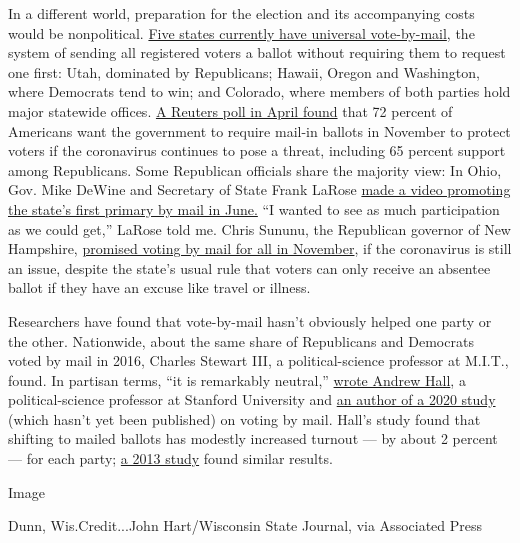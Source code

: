 In a different world, preparation for the election and its accompanying
costs would be nonpolitical. \href{https://www.voteathome.org/}{Five
states currently have universal vote-by-mail}, the system of sending all
registered voters a ballot without requiring them to request one first:
Utah, dominated by Republicans; Hawaii, Oregon and Washington, where
Democrats tend to win; and Colorado, where members of both parties hold
major statewide offices.
\href{https://www.reuters.com/article/us-usa-election-poll-idUSKBN21P3G0}{A
Reuters poll in April found} that 72 percent of Americans want the
government to require mail-in ballots in November to protect voters if
the coronavirus continues to pose a threat, including 65 percent support
among Republicans. Some Republican officials share the majority view: In
Ohio, Gov. Mike DeWine and Secretary of State Frank LaRose
\href{https://www.youtube.com/watch?v=gYliBlyROxo\&feature=youtu.be}{made
a video promoting the state's first primary by mail in June.} ``I wanted
to see as much participation as we could get,'' LaRose told me. Chris
Sununu, the Republican governor of New Hampshire,
\href{https://www.washingtonpost.com/politics/new-hampshire-gov-sununu-to-allow-absentee-voting-in-november-because-of-coronavirus-outbreak/2020/04/09/d0aa21c8-7aa2-11ea-a130-df573469f094_story.html}{promised
voting by mail for all in November}, if the coronavirus is still an
issue, despite the state's usual rule that voters can only receive an
absentee ballot if they have an excuse like travel or illness.

Researchers have found that vote-by-mail hasn't obviously helped one
party or the other. Nationwide, about the same share of Republicans and
Democrats voted by mail in 2016, Charles Stewart III, a
political-science professor at M.I.T., found. In partisan terms, ``it is
remarkably neutral,''
\href{https://twitter.com/andrewbhall/status/1250104293866098688}{wrote
Andrew Hall}, a political-science professor at Stanford University and
\href{http://www.andrewbenjaminhall.com/Thompson_et_al_VBM.pdf}{an
author of a 2020 study} (which hasn't yet been published) on voting by
mail. Hall's study found that shifting to mailed ballots has modestly
increased turnout --- by about 2 percent --- for each party;
\href{https://isps.yale.edu/research/publications/isps13-012}{a 2013
study} found similar results.

Image

Dunn, Wis.Credit...John Hart/Wisconsin State Journal, via Associated
Press

